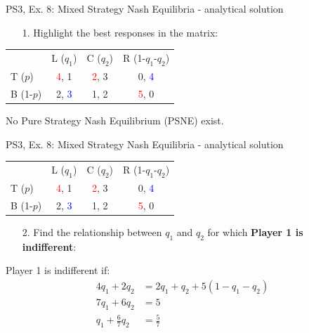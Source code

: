 \begin{frame}{PS3, Ex. 8: Mixed Strategy Nash Equilibria - analytical solution}
  \begin{multicols}{2}
    \begin{itemize}
      \item[1.] Highlight the best responses in the matrix:
    \end{itemize}
    \begin{table}
      \begin{tabular}{l|c|c|c|}
          \multicolumn{1}{c}{}  & \multicolumn{1}{c}{L ($q_1$)} & \multicolumn{1}{c}{C ($q_2$)} & \multicolumn{1}{c}{R (1-$q_1$-$q_2$)} \\\cline{2-4}
          T ($p$)   & \textcolor{red}{4}, 1 & \textcolor{red}{2}, 3 & 0, \textcolor{blue}{4} \\\cline{2-4}
          B (1-$p$) & 2, \textcolor{blue}{3} & 1, 2 & \textcolor{red}{5}, 0 \\\cline{2-4}
      \end{tabular}
    \end{table}
    No Pure Strategy Nash Equilibrium (PSNE) exist.
  \vfill\null \columnbreak
  \vfill\null
  \end{multicols}
\end{frame}
\begin{frame}{PS3, Ex. 8: Mixed Strategy Nash Equilibria - analytical solution}
  \begin{multicols}{2}
    \begin{table}
      \begin{tabular}{l|c|c|c|}
          \multicolumn{1}{c}{}  & \multicolumn{1}{c}{L ($q_1$)} & \multicolumn{1}{c}{C ($q_2$)} & \multicolumn{1}{c}{R (1-$q_1$-$q_2$)} \\\cline{2-4}
          T ($p$)   & \textcolor{red}{4}, 1 & \textcolor{red}{2}, 3 & 0, \textcolor{blue}{4} \\\cline{2-4}
          B (1-$p$) & 2, \textcolor{blue}{3} & 1, 2 & \textcolor{red}{5}, 0 \\\cline{2-4}
      \end{tabular}
    \end{table}
    \begin{itemize}
      \item[2.] Find the relationship between $q_1$ and $q_2$ for which \textbf{Player 1 is indifferent}:
    \end{itemize}
    Player 1 is indifferent if:
    \begin{align*}
      4q_1 + 2q_2 &= 2q_1 + q_2 + 5(1-q_1-q_2)\\
      7q_1 + 6q_2 &= 5 \\
      q_1 + \frac{6}{7}q_2 &= \frac{5}{7}
    \end{align*}
  \vfill\null \columnbreak
  \vfill\null
  \end{multicols}
\end{frame}
